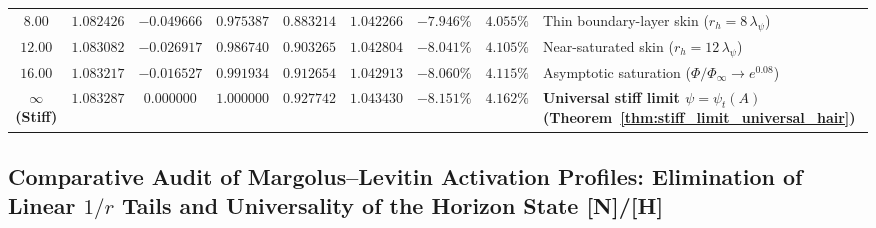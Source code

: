 \documentclass[11pt,a4paper]{article}
\newcommand{\catH}{\textbf{\textcolor{orange!85!black}{[H]}}}
\newcommand{\catN}{\textbf{\textcolor{teal!75!black}{[N]}}}
\theoremstyle{definition}
\theoremstyle{remark}
\begin{document}
\begin{table}[H]
{\begin{tabular}{@{} c c c c c c c c l @{}}
    $8.00$ & $1.082426$ & $-0.049666$ & $0.975387$ & $0.883214$ & $1.042266$ & $-7.946\%$ & $4.055\%$ & Thin boundary-layer skin ($r_h = 8\,\lambda_{\psi}$) \\
    $12.00$ & $1.083082$ & $-0.026917$ & $0.986740$ & $0.903265$ & $1.042804$ & $-8.041\%$ & $4.105\%$ & Near-saturated skin ($r_h = 12\,\lambda_{\psi}$) \\
    $16.00$ & $1.083217$ & $-0.016527$ & $0.991934$ & $0.912654$ & $1.042913$ & $-8.060\%$ & $4.115\%$ & Asymptotic saturation ($\Phi/\Phi_{\infty} \to e^{0.08}$) \\
    $\bm{\infty}$ \textbf{(Stiff)} & $\mathbf{1.083287}$ & $\mathbf{0.000000}$ & $\mathbf{1.000000}$ & $\mathbf{0.927742}$ & $\mathbf{1.043430}$ & $\mathbf{-8.151\%}$ & $\mathbf{4.162\%}$ & \textbf{Universal stiff limit $\psi = \psi_t(A)$ (Theorem~\ref{thm:stiff_limit_universal_hair})} \\
    \bottomrule
  \end{tabular}%
  }
\end{table}

\subsection{\texorpdfstring{Comparative Audit of Margolus--Levitin Activation Profiles: Elimination of Linear $1/r$ Tails and Universality of the Horizon State \catN/\catH}{Comparative Audit of Margolus-Levitin Activation Profiles: Elimination of Linear 1/r Tails and Universality of the Horizon State}}
\end{document}
